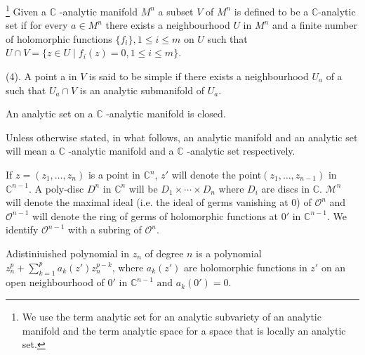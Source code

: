 \begin{definition}\label{chap1-defins3}\footnote{We use the term
    analytic set for an 
    analytic subvariety of 
    an analytic manifold and the term analytic space for a space that
    is locally an analytic set.} Given a $\mathbb{C}$ -analytic
  manifold $M^{n}$ a subset $V$ of $M^{n}$ is defined to be a
  $\mathbb{C}$-analytic set if for every $a \in M^{n}$ there exists a
  neighbourhood $U$ in $M^{n}$ and a finite number of holomorphic
  functions $\bigg\{ f_{i} \bigg\}, 1 \leq i \leq m$ on $U$ such that
  $U \cap V = \{ z \in U \mid f_{i} (z) = 0, 1 \leq i \leq m\}$. 

  (4). A point a in $V$ is said to be simple if there exists a
  neighbourhood $U_{a}$ of a such that $U_{a} \cap V$ is an analytic
  submanifold of $U_{a}$. 
\end{definition}

\begin{remark}\label{chap1-rem1}  %
  An analytic set on a $\mathbb{C}$ -analytic manifold is closed. 
\end{remark}

Unless otherwise stated, in what follows, an analytic manifold and an
analytic set will mean a $\mathbb{C}$ -analytic manifold and a
$\mathbb{C}$ -analytic set respectively.  

\begin{notation*}
  If  $z = (z_{1}, \ldots , z_{n})$ is a point in $\mathbb{C}^{n}$, $z'$
  will denote the point\break $(z_{1}, \ldots , z_{n-1})$ in
  $\mathbb{C}^{n-1}$. A poly-disc $D^{n}$ in $\mathbb{C}^{n}$
  will be $D_{1}\times \cdots \times D_{n}$ where $D_{i}$ are
  discs in $\mathbb{C}$. $\mathscr{M}^{n}$ will denote the maximal
  ideal (i.e. the 
  ideal of germs vanishing at $0$) of $\mathscr{O}^{n}$ and
  $\mathscr{O}^{n-1}$ will denote the ring of germs of holomorphic
  functions at $0'$  in $\mathbb{C}^{n-1}$. We identify
  $\mathscr{O}^{n-1}$ with a subring of $\mathscr{O}^{n}$. 
\end{notation*}

\setcounter{definitions}{4}
\begin{definitions}\label{chap1-defins5} 
  A\pageoriginale distiniuished polynomial  in $z_{n}$ of degree $n$
  is a polynomial 
  $z^{p}_{n} + \sum\limits_{k=1}^{p} a_k (z')z_{n}^{p-k} $, where
  $a_{k}(z')$ are holomorphic functions in $z'$ on an open
  neighbourhood of $0' \text{ in } \mathbb{C}^{n-1} \text{ and }
  a_{k}(0') = 0$.  
\end{definitions}


